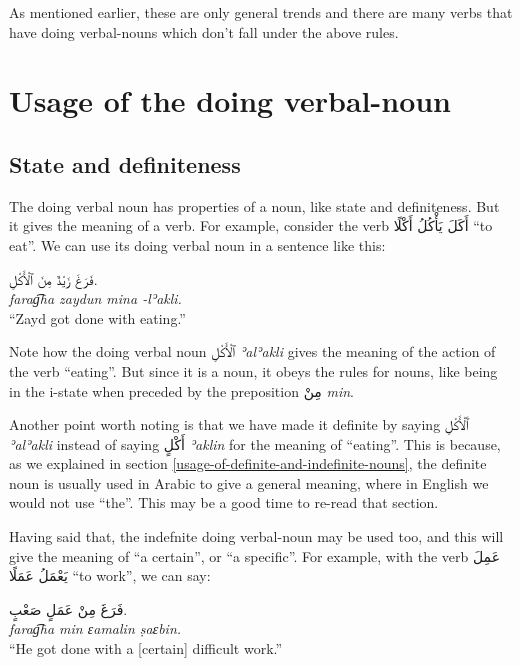 \documentclass[
  10pt,
]{book}
\begin{document}
As mentioned earlier, these are only general trends and there are many verbs that have doing verbal-nouns which don't fall under the above rules.

\section{Usage of the doing verbal-noun}\label{usage-of-the-doing-verbal-noun}

\subsection{State and definiteness}\label{state-and-definiteness}

The doing verbal noun has properties of a noun, like state and definiteness. But it gives the meaning of a verb. For example, consider the verb \foreignlanguage{arabic}{أَکَلَ يَأْکُلُ أَکْلًا} \enquote{to eat}. We can use its doing verbal noun in a sentence like this:

\foreignlanguage{arabic}{فَرَغَ زَيْدٌ مِنَ ٱلْأَکْلِ.}\\
\emph{farag͡ha zaydun mina -lʾakli.}\\
\enquote{Zayd got done with eating.}

Note how the doing verbal noun \foreignlanguage{arabic}{ٱلْأَکْلِ} \emph{ʾalʾakli} gives the meaning of the action of the verb \enquote{eating}. But since it is a noun, it obeys the rules for nouns, like being in the i-state when preceded by the preposition \foreignlanguage{arabic}{مِنْ} \emph{min}.

Another point worth noting is that we have made it definite by saying \foreignlanguage{arabic}{ٱَلْأَکْلِ} \emph{ʾalʾakli} instead of saying \foreignlanguage{arabic}{أَکْلٍ} \emph{ʾaklin} for the meaning of \enquote{eating}. This is because, as we explained in section
\ref{usage-of-definite-and-indefinite-nouns},
the definite noun is usually used in Arabic to give a general meaning, where in English we would not use \enquote{the}. This may be a good time to re-read that section.

Having said that, the indefnite doing verbal-noun may be used too, and this will give the meaning of \enquote{a certain}, or \enquote{a specific}. For example, with the verb \foreignlanguage{arabic}{عَمِلَ يَعْمَلُ عَمَلًا} \enquote{to work}, we can say:

\foreignlanguage{arabic}{فَرَغَ مِنْ عَمَلٍ صَعْبٍ.}\\
\emph{farag͡ha min ɛamalin ṣaɛbin.}\\
\enquote{He got done with a {[}certain{]} difficult work.}
\end{document}
